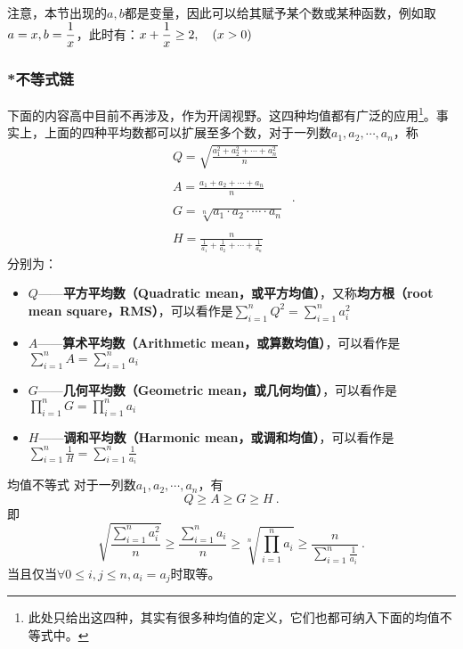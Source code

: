 注意，本节出现的$a,b$都是变量，因此可以给其赋予某个数或某种函数，例如取$\displaystyle a=x,b={1\over x}$，此时有：$\displaystyle x+{1\over x}\geq2,\quad(x>0)$


\subsubsection{*不等式链}

下面的内容高中目前不再涉及，作为开阔视野。这四种均值都有广泛的应用\footnote{此处只给出这四种，其实有很多种均值的定义，它们也都可纳入下面的均值不等式中。}。事实上，上面的四种平均数都可以扩展至多个数，对于一列数$a_1,a_2,\cdots,a_n$，称
\begin{equation}
\begin{array}{c} 
\displaystyle Q = \sqrt{\frac{a_1^2 + a_2^2 + \cdots + a_n^2}{n}}\\\\
\displaystyle A = \frac{a_1 + a_2 + \cdots + a_n}{n}\\\\
\displaystyle G = \sqrt[n]{a_1 \cdot a_2 \cdot \cdots \cdot a_n}\\\\
\displaystyle H = \frac{n}{\frac{1}{a_1} + \frac{1}{a_2} + \cdots + \frac{1}{a_n}}
\end{array}~.
\end{equation}
分别为：
\begin{itemize}
\item $Q$——\textbf{平方平均数（Quadratic mean，或平方均值）}，又称\textbf{均方根（root mean square，RMS）}，可以看作是$\displaystyle \sum_{i=1}^nQ^2= \sum_{i=1}^na_i^2$
\item $A$——\textbf{算术平均数（Arithmetic mean，或算数均值）}，可以看作是$\displaystyle \sum_{i=1}^nA= \sum_{i=1}^n{a_i}$
\item $G$——\textbf{几何平均数（Geometric mean，或几何均值）}，可以看作是$\displaystyle \prod_{i=1}^nG= \prod_{i=1}^n{a_i}$
\item $H$——\textbf{调和平均数（Harmonic mean，或调和均值）}，可以看作是$\displaystyle \sum_{i=1}^n\frac{1}{H}= \sum_{i=1}^n\frac{1}{a_i}$
\end{itemize}

\begin{theorem}{均值不等式}
对于一列数$a_1,a_2,\cdots,a_n$，有
\begin{equation}
Q\geq A\geq G\geq H~.
\end{equation}
即
\begin{equation}
\displaystyle\sqrt{\frac{\displaystyle\sum_{i=1}^na_i^2}{n}}\geq \frac{\displaystyle\sum_{i=1}^na_i}{n}\geq \sqrt[n]{\prod_{i=1}^na_i}\geq \frac{n}{\displaystyle\sum_{i=1}^n\frac{1}{a_i}}~.
\end{equation}
当且仅当$\forall 0\leq i,j\leq n,a_i=a_j$时取等。
\end{theorem}


